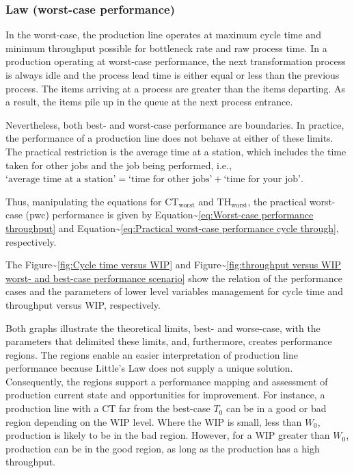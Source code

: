 \documentclass{article}
\begin{document}
\subsubsection{Law (worst-case performance)}
\label{sec:org143ccdf}

In the worst-case, the production line operates at maximum cycle time and minimum throughput possible for bottleneck rate and raw process time.
In a production operating at worst-case performance, the next transformation process is always idle and the process lead time is either equal or less than the previous process.
The items arriving at a process are greater than the items departing.
As a result, the items pile up in the queue at the next process entrance.

Nevertheless, both best- and worst-case performance are boundaries.
In practice, the performance of a production line does not behave at either of these limits.
The practical restriction is the average time at a station, which includes the time taken for other jobs and the job being performed, i.e., \(\mbox{`average time at a station'} = \mbox{`time for other jobs'} + \mbox{`time for your job'}\).

Thus, manipulating the equations for \(\mbox{CT}_{\mbox{worst}}\) and \(\mbox{TH}_{\mbox{worst}}\), the practical worst-case (pwc) performance is given by Equation\textasciitilde{}\ref{eq:Worst-case performance throughput} and Equation\textasciitilde{}\ref{eq:Practical worst-case performance cycle through}, respectively.

The Figure\textasciitilde{}\ref{fig:Cycle time versus WIP} and Figure\textasciitilde{}\ref{fig:throughput versus WIP worst- and best-case performance scenario} show the relation of the performance cases and the parameters of lower level variables management for cycle time and throughput versus WIP, respectively.

Both graphs illustrate the theoretical limits, best- and worse-case, with the parameters that delimited these limits, and, furthermore, creates performance regions.
The regions enable an easier interpretation of production line performance because Little's Law does not supply a unique solution.
Consequently, the regions support a performance mapping and assessment of production current state and opportunities for improvement.
For instance, a production line with a CT far from the best-case \(T_0\) can be in a good or bad region depending on the WIP level.
Where the WIP is small, less than \(W_0\), production is likely to be in the bad region.
However, for a WIP greater than \(W_0\), production can be in the good region, as long as the production has a high throughput.
\end{document}
